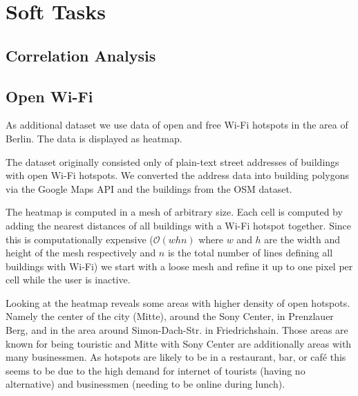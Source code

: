 \section*{Soft Tasks}
\subsection*{Correlation Analysis}

\todo{}

\subsection*{Open Wi-Fi}

As additional dataset we use data of open and free Wi-Fi hotspots in
the area of Berlin.
The data is displayed as heatmap.

The dataset originally consisted only of plain-text street addresses
of buildings with open Wi-Fi hotspots. We converted the
address data into building polygons via the Google Maps
API and the buildings from the OSM dataset.

The heatmap is computed in a mesh of
arbitrary size. Each cell is computed by adding
the nearest distances of all buildings with a Wi-Fi
hotspot together.
Since this is computationally expensive ($\mathcal{O}(whn)$ where $w$ and $h$
are the width and height of the mesh respectively and $n$ is the total number of lines
defining all buildings with Wi-Fi)
we start with a loose mesh and refine it up to one pixel per cell while the
user is inactive.

Looking at the heatmap reveals some areas with higher density of open hotspots.
Namely the center of the city (Mitte), around the Sony Center, in Prenzlauer Berg, and
in the area around Simon-Dach-Str. in Friedrichshain.
Those areas are known for being touristic and Mitte with Sony Center are additionally
areas with many businessmen.
As hotspots are likely to be in a restaurant, bar, or caf\'{e}
this seems to be due to the high demand for internet
of tourists (having no alternative) and businessmen (needing to
be online during lunch).
